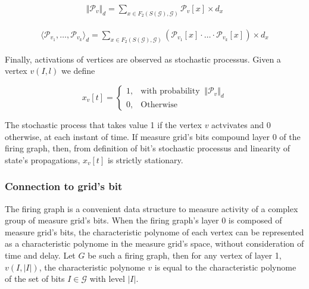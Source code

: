 \documentclass[a4paper, 11pt]{article}
\begin{document}
\vspace{10px}\begin{minipage}{.3\linewidth}
\begin{align*}
\Vert \mathcal{P}_v \Vert_{d} = \sum_{x \in F_2(S(\mathcal{G}), \mathcal{G})} \mathcal{P}_v\left[ x \right] \times d_x
\end{align*}
\end{minipage}%
\noindent\begin{minipage}{.7\linewidth}
\begin{align*}
\langle \mathcal{P}_{v_1}, \ldots,  \mathcal{P}_{v_k} \rangle_{d} = \sum_{x \in F_2(S(\mathcal{G}), \mathcal{G})} \left( \mathcal{P}_{v_1} \left[ x \right] \cdot \ldots \cdot \mathcal{P}_{v_k} \left[ x \right] \right) \times d_x
\end{align*}
\end{minipage}\vspace{15px}


Finally, activations of vertices are observed as stochastic processus. Given a vertex $v(I, l)$ we define

\begin{equation*}
x_v[t] = \begin{cases} 1, & \text{with probability }\ \Vert \mathcal{P}_v \Vert_{d}\\ 0, & \text{Otherwise} \end{cases}
\end{equation*}

The stochastic process that takes value 1 if the vertex $v$ actvivates and 0 otherwise, at each instant of time. If measure grid's bits compound layer 0 of the firing graph, then, from definition of bit's stochastic processus and linearity of state's propagations, $x_v[t]$ is strictly stationary.


\subsubsection*{Connection to grid's bit}

The firing graph is a convenient data structure to measure activity of a complex group of measure grid's bits. When the firing graph's layer 0 is composed of measure grid's bits, the characteristic polynome of each vertex can be represented as a characteristic polynome in the measure grid's space, without consideration of time and delay. Let $G$ be such a firing graph, then for any vertex of layer 1, $v(I, \vert I \vert)$, the characteristic polynome $v$ is equal to the characteristic polynome of the set of bits $I \in \mathcal{G}$ with level $\vert I \vert$.
\end{document}
